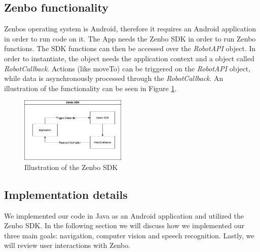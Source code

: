 \documentclass[conference]{IEEEtran}
\begin{document}
\subsection{Zenbo functionality}
Zenbos operating system is Android, therefore it requires an Android application in order to run code on it.
The App needs the Zenbo SDK in order to run Zenbo functions. 
The SDK functions can then be accessed over the \textit{RobotAPI} object. 
In order to instantiate, the object needs the application context and a object called \textit{RobotCallback}.
Actions (like moveTo) can be triggered on the \textit{RobotAPI} object, while data is asynchronously processed 
through the \textit{RobotCallback}. An illustration of the functionality can be seen in Figure \ref{fig:zenboSDK}. 
\begin{figure}  \label{fig:zenboSDK}
	\begin{center}
		\includegraphics[width=0.45\textwidth]{pics/zenboSDK.jpg}
	\end{center}
	\caption{Illustration of the Zenbo SDK}
\end{figure}
\subsection{Implementation details}
We implemented our code in Java as an Android application and utilized the Zenbo SDK. In the following section
we will discuss how we implemented our three main goals: navigation, computer vision and speech recognition.
Lastly, we will review user interactions with Zenbo.\\
\end{document}
